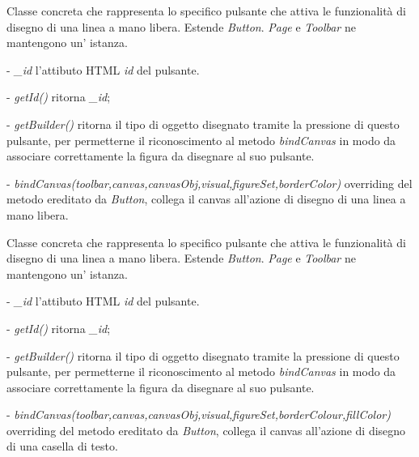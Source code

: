 Classe concreta che rappresenta lo specifico pulsante che attiva le funzionalit\` a di disegno di una linea a mano libera.
Estende \textit{Button}.
\textit{Page} e \textit{Toolbar} ne mantengono un' istanza.
\begin{elencopuntato}[\subsubsecindent]
\item[-] \textit{{\_}id} l'attibuto HTML \textit{id} del pulsante.
\end{elencopuntato}
\begin{elencopuntato}[\subsubsecindent]
\item[-] \textit{getId()} ritorna \textit{{\_}id};
\item[-] \textit{getBuilder()} ritorna il tipo di oggetto disegnato tramite la pressione di questo pulsante, per permetterne il riconoscimento al metodo \textit{bindCanvas} in modo da associare correttamente la figura da disegnare al suo pulsante.
\item[-]  \textit{bindCanvas(toolbar,canvas,canvasObj,visual,figureSet,borderColor)} overriding del metodo ereditato da \textit{Button}, collega il canvas all'azione di disegno di una linea a mano libera.
\end{elencopuntato}


Classe concreta che rappresenta lo specifico pulsante che attiva le funzionalit\` a di disegno di una linea a mano libera.
Estende \textit{Button}.
\textit{Page} e \textit{Toolbar} ne mantengono un' istanza.
\begin{elencopuntato}[\subsubsecindent]
\item[-] \textit{{\_}id} l'attibuto HTML \textit{id} del pulsante.
\end{elencopuntato}
\begin{elencopuntato}[\subsubsecindent]
\item[-] \textit{getId()} ritorna \textit{{\_}id};
\item[-] \textit{getBuilder()} ritorna il tipo di oggetto disegnato tramite la pressione di questo pulsante, per permetterne il riconoscimento al metodo \textit{bindCanvas} in modo da associare correttamente la figura da disegnare al suo pulsante.
\item[-]  \textit{bindCanvas(toolbar,canvas,canvasObj,visual,figureSet,borderColour,fillColor)} overriding del metodo ereditato da \textit{Button}, collega il canvas all'azione di disegno di una casella di testo. 
\end{elencopuntato}

